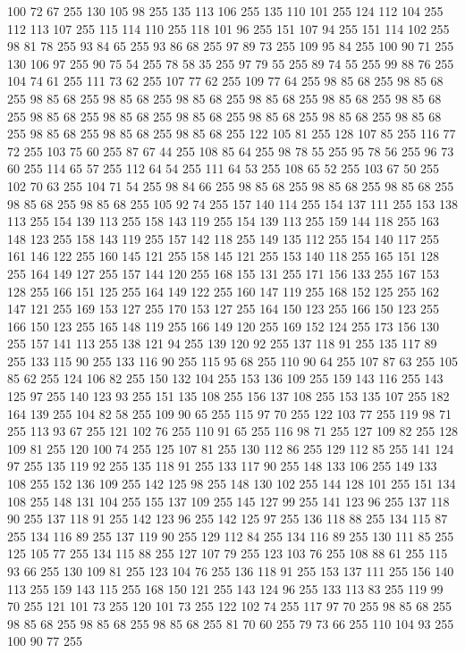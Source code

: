 100 72 67 255 130 105 98 255 135 113 106 255 135 110 101 255 124 112 104 255 112 113 107 255 115 114 110 255 118 101 96 255 151 107 94 255 151 114 102 255 98 81 78 255 93 84 65 255 93 86 68 255 97 89 73 255 109 95 84 255 100 90 71 255 130 106 97 255 90 75 54 255 78 58 35 255 97 79 55 255 89 74 55 255 99 88 76 255 104 74 61 255 111 73 62 255 107 77 62 255 109 77 64 255 98 85 68 255 98 85 68 255 98 85 68 255 98 85 68 255 98 85 68 255 98 85 68 255 98 85 68 255 98 85 68 255 98 85 68 255 98 85 68 255 98 85 68 255 98 85 68 255 98 85 68 255 98 85 68 255 98 85 68 255 98 85 68 255 98 85 68 255 122 105 81 255 128 107 85 255 116 77 72 255 103 75 60 255 87 67 44 255 108 85 64 255 98 78 55 255 95 78 56 255 96 73 60 255 114 65 57 255 112 64 54 255 111 64 53 255 108 65 52 255 103 67 50 255 102 70 63 255 104 71 54 255 98 84 66 255 98 85 68 255 98 85 68 255 98 85 68 255 98 85 68 255
98 85 68 255 105 92 74 255 157 140 114 255 154 137 111 255 153 138 113 255 154 139 113 255 158 143 119 255 154 139 113 255 159 144 118 255 163 148 123 255 158 143 119 255 157 142 118 255 149 135 112 255 154 140 117 255 161 146 122 255 160 145 121 255 158 145 121 255 153 140 118 255 165 151 128 255 164 149 127 255 157 144 120 255 168 155 131 255 171 156 133 255 167 153 128 255 166 151 125 255 164 149 122 255 160 147 119 255 168 152 125 255 162 147 121 255 169 153 127 255 170 153 127 255 164 150 123 255 166 150 123 255 166 150 123 255 165 148 119 255 166 149 120 255 169 152 124 255 173 156 130 255 157 141 113 255 138 121 94 255 139 120 92 255 137 118 91 255 135 117 89 255 133 115 90 255 133 116 90 255 115 95 68 255 110 90 64 255 107 87 63 255 105 85 62 255 124 106 82 255 150 132 104 255 153 136 109 255 159 143 116 255 143 125 97 255 140 123 93 255 151 135 108 255 156 137 108 255 153 135 107 255 182 164 139 255 104 82 58 255 109 90 65 255 115 97 70 255 122 103 77 255 119 98 71 255
113 93 67 255 121 102 76 255 110 91 65 255 116 98 71 255 127 109 82 255 128 109 81 255 120 100 74 255 125 107 81 255 130 112 86 255 129 112 85 255 141 124 97 255 135 119 92 255 135 118 91 255 133 117 90 255 148 133 106 255 149 133 108 255 152 136 109 255 142 125 98 255 148 130 102 255 144 128 101 255 151 134 108 255 148 131 104 255 155 137 109 255 145 127 99 255 141 123 96 255 137 118 90 255 137 118 91 255 142 123 96 255 142 125 97 255 136 118 88 255 134 115 87 255 134 116 89 255 137 119 90 255 129 112 84 255 134 116 89 255 130 111 85 255 125 105 77 255 134 115 88 255 127 107 79 255 123 103 76 255 108 88 61 255 115 93 66 255 130 109 81 255 123 104 76 255 136 118 91 255 153 137 111 255 156 140 113 255 159 143 115 255 168 150 121 255 143 124 96 255 133 113 83 255 119 99 70 255 121 101 73 255 120 101 73 255 122 102 74 255 117 97 70 255 98 85 68 255 98 85 68 255 98 85 68 255 98 85 68 255 81 70 60 255 79 73 66 255 110 104 93 255 100 90 77 255
